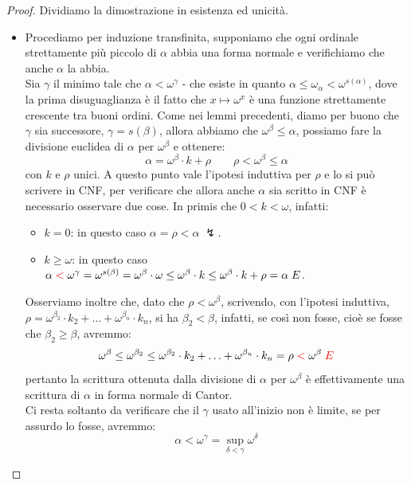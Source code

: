 \begin{proof}
	Dividiamo la dimostrazione in esistenza ed unicit\`a.
	\begin{itemize}
		\item[$\boxed{\text{esistenza}}$] Procediamo per induzione transfinita, supponiamo che ogni ordinale strettamente pi\`u piccolo di $\alpha$ abbia una forma normale e verifichiamo che anche $\alpha$ la abbia.\\
		Sia $\gamma$ il minimo tale che $\alpha < \omega^\gamma$ - che esiste in quanto $\alpha \leq \omega_\alpha < \omega^{s(\alpha)}$, dove la prima disuguaglianza \`e il fatto che $x \mapsto \omega^x$ \`e una funzione strettamente crescente tra buoni ordini.
		Come nei lemmi precedenti, diamo per buono che $\gamma$ sia successore, $\gamma = s(\beta)$, allora abbiamo che $\omega^\beta \leq \alpha$, possiamo fare la divisione euclidea di $\alpha$ per $\omega^\beta$ e ottenere:
		\[ \alpha = \omega^\beta \cdot k + \rho \qquad \rho < \omega^\beta \leq \alpha
			\]
		con $k$ e $\rho$ unici. A questo punto vale l'ipotesi induttiva per $\rho$ e lo si pu\`o scrivere in CNF, per verificare che allora anche $\alpha$ sia scritto in CNF \`e necessario osservare due cose. In primis che $0 < k < \omega$, infatti:
		\begin{itemize}
			\item \textbf{\underline{$k = 0$}}: in questo caso $\alpha = \rho < \alpha \; \lightning$.
			\item \textbf{\underline{$k \geq \omega$}}: in questo caso $\alpha \;\textcolor{red}<\;\omega^\gamma = \omega^{s(\beta)} = \omega^\beta \cdot \omega \leq \omega^\beta \cdot k \leq \omega^\beta \cdot k + \rho = \alpha \; \lightning$.
		\end{itemize}
		Osserviamo inoltre che, dato che $\rho < \omega^\beta$, scrivendo, con l'ipotesi induttiva, $\rho = \omega^{\beta_2} \cdot k_2 + \ldots + \omega^{\beta_n} \cdot k_n$, si ha $\beta_2 < \beta$, infatti, se cos\`i non fosse, cio\`e se fosse che $\beta_2 \geq \beta$, avremmo:
		\[ \omega^\beta \leq \omega^{\beta_2} \leq \omega^{\beta_2} \cdot k_2 + \ldots + \omega^{\beta_n} \cdot k_n = \rho \;\textcolor{red}<\; \omega^\beta \; \textcolor{red}\lightning
			\]
		pertanto la scrittura ottenuta dalla divisione di $\alpha$ per $\omega^\beta$ \`e effettivamente una scrittura di $\alpha$ in forma normale di Cantor.\\
		Ci resta soltanto da verificare che il $\gamma$ usato all'inizio non \`e limite, se per assurdo lo fosse, avremmo:
		\[ \alpha < \omega^\gamma = \sup_{\delta < \gamma} \omega^\delta
\]
\end{itemize}
\end{proof}
